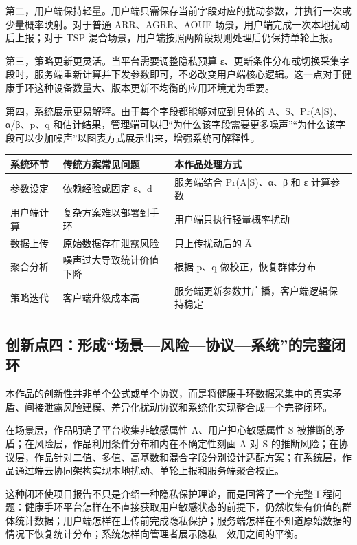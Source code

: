 \documentclass{cumcmthesis}
\numberwithin{equation}{section}
\numberwithin{figure}{section}
\numberwithin{table}{section}
\begin{document}
第二，用户端保持轻量。用户端只需保存当前字段对应的扰动参数，并执行一次或少量概率映射。对于普通 ARR、AGRR、AOUE 场景，用户端完成一次本地扰动后上报；对于 TSP 混合场景，用户端按照两阶段规则处理后仍保持单轮上报。

第三，策略更新更灵活。当平台需要调整隐私预算 ε、更新条件分布或切换采集字段时，服务端重新计算并下发参数即可，不必改变用户端核心逻辑。这一点对于健康手环这种设备数量大、版本更新不均衡的应用环境尤为重要。

第四，系统展示更易解释。由于每个字段都能够对应到具体的 A、S、Pr(A|S)、α/β、p、q 和估计结果，管理端可以把“为什么该字段需要更多噪声”“为什么该字段可以少加噪声”以图表方式展示出来，增强系统可解释性。

\begin{table}[htbp]
\centering
\small
\begin{tabularx}{\textwidth}{|>{\raggedright\arraybackslash}X|>{\raggedright\arraybackslash}X|>{\raggedright\arraybackslash}X|}
\hline
系统环节 & 传统方案常见问题 & 本作品处理方式 \\ \hline
参数设定 & 依赖经验或固定 ε、d & 服务端结合 Pr(A|S)、α、β 和 ε 计算参数 \\ \hline
用户端计算 & 复杂方案难以部署到手环 & 用户端只执行轻量概率扰动 \\ \hline
数据上传 & 原始数据存在泄露风险 & 只上传扰动后的 Ã \\ \hline
聚合分析 & 噪声过大导致统计价值下降 & 根据 p、q 做校正，恢复群体分布 \\ \hline
策略迭代 & 客户端升级成本高 & 服务端更新参数并广播，客户端逻辑保持稳定 \\ \hline
\end{tabularx}
\end{table}

\subsection{创新点四：形成“场景—风险—协议—系统”的完整闭环}

本作品的创新性并非单个公式或单个协议，而是将健康手环数据采集中的真实矛盾、间接泄露风险建模、差异化扰动协议和系统化实现整合成一个完整闭环。

在场景层，作品明确了平台收集非敏感属性 A、用户担心敏感属性 S 被推断的矛盾；在风险层，作品利用条件分布和内在不确定性刻画 A 对 S 的推断风险；在协议层，作品针对二值、多值、高基数和混合字段分别设计适配方案；在系统层，作品通过端云协同架构实现本地扰动、单轮上报和服务端聚合校正。

这种闭环使项目报告不只是介绍一种隐私保护理论，而是回答了一个完整工程问题：健康手环平台怎样在不直接获取用户敏感状态的前提下，仍然收集有价值的群体统计数据；用户端怎样在上传前完成隐私保护；服务端怎样在不知道原始数据的情况下恢复统计分布；系统怎样向管理者展示隐私—效用之间的平衡。
\end{document}
